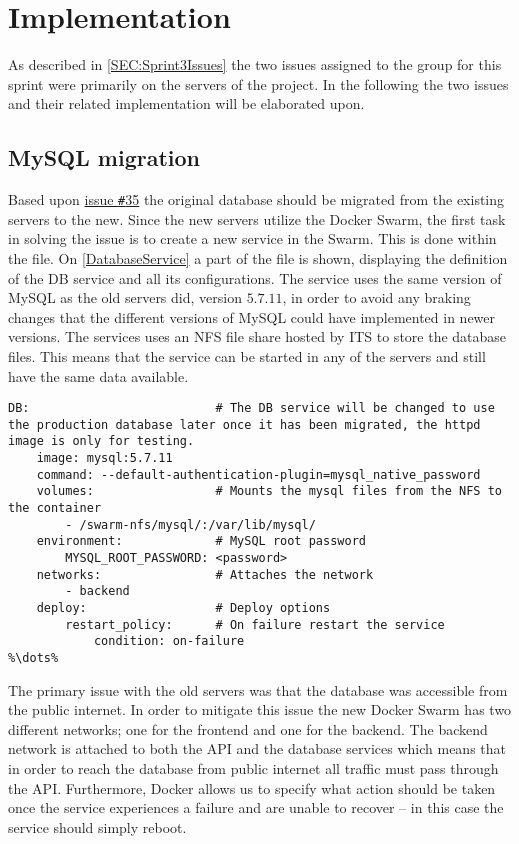 \section{Implementation} \label{SEC:Sprint3Implementation}
As described in \autoref{SEC:Sprint3Issues} the two issues assigned to the group for this sprint were primarily on the servers of the project.
In the following the two issues and their related implementation will be elaborated upon.

\subsection{MySQL migration}
Based upon \href{https://github.com/aau-giraf/wiki/issues/35}{issue \texttt{\#}35} the original database should be migrated from the existing servers to the new.
Since the new servers utilize the Docker Swarm, the first task in solving the issue is to create a new service in the Swarm.
This is done within the  file.
On \autoref{DatabaseService} a part of the file is shown, displaying the definition of the DB service and all its configurations.
The service uses the same version of MySQL as the old servers did, version $5.7.11$, in order to avoid any braking changes that the different versions of MySQL could have implemented in newer versions.
The services uses an NFS file share hosted by ITS to store the database files.
This means that the service can be started in any of the servers and still have the same data available.

\begin{lstlisting}[caption={Docker database service},captionpos=b,label=DatabaseService,escapechar=\%]
%\dots%
DB:                          # The DB service will be changed to use the production database later once it has been migrated, the httpd image is only for testing.
    image: mysql:5.7.11
    command: --default-authentication-plugin=mysql_native_password
    volumes:                 # Mounts the mysql files from the NFS to the container
        - /swarm-nfs/mysql/:/var/lib/mysql/
    environment:             # MySQL root password
        MYSQL_ROOT_PASSWORD: <password>
    networks:                # Attaches the network
        - backend
    deploy:                  # Deploy options
        restart_policy:      # On failure restart the service
            condition: on-failure
%\dots%
\end{lstlisting}

The primary issue with the old servers was that the database was accessible from the public internet.
In order to mitigate this issue the new Docker Swarm has two different networks; one for the frontend and one for the backend.
The backend network is attached to both the API and the database services which means that in order to reach the database from public internet all traffic must pass through the API.
Furthermore, Docker allows us to specify what action should be taken once the service experiences a failure and are unable to recover -- in this case the service should simply reboot.

